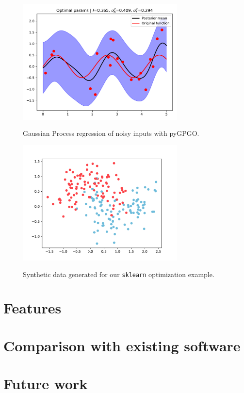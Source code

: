 \documentclass[10pt,a4paper,twoside]{book}
\begin{document}
\FloatBarrier
\begin{figure}
\centering
\caption{Gaussian Process regression of noisy inputs with pyGPGO.}
\includegraphics[width=0.75\textwidth]{figures/chapter5/noiseopt}
\label{fig:noiseopt}
\end{figure}

\begin{figure}
\centering
\caption{Synthetic data generated for our \texttt{sklearn} optimization example.}
\includegraphics[width=0.75\textwidth]{figures/chapter5/makemoons}
\label{fig:makemoons}
\end{figure}




\section{Features}\label{features}
\section{Comparison with existing software}
\section{Future work}
\end{document}
